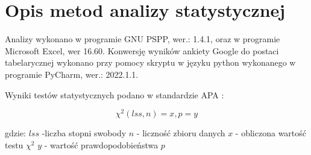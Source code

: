\documentclass[a4paper,12pt,twoside,openright]{mwrep}
\begin{document}
\section{Opis metod analizy statystycznej}

Analizy wykonano w programie GNU PSPP, wer.: 1.4.1, oraz w programie Microsoft Excel, wer 16.60. Konwersję wyników ankiety Google do postaci tabelarycznej wykonano przy pomocy skryptu w języku python wykonanego w programie PyCharm, wer.: 2022.1.1.

\vspace{\baselineskip} 

Wyniki testów statystycznych podano w standardzie APA \cite{apa}:\newline

\begin{equation}
    \chi^2 (lss, n) = x, p=y
\end{equation}

\vspace{\baselineskip} 
gdzie:\newline
$lss$ -liczba stopni swobody\newline
$n$ - liczność zbioru danych\newline
$x$ - obliczona wartość testu $\chi^2$\newline
$y$ - wartość prawdopodobieństwa $p$\newline
\end{document}
